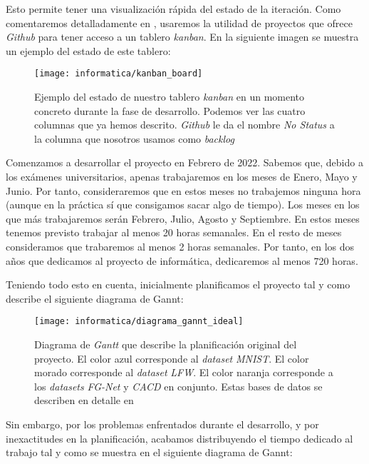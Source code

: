 Esto permite tener una visualización rápida del estado de la iteración. Como comentaremos detalladamente en , usaremos la utilidad de proyectos que ofrece \textit{Github} para tener acceso a un tablero \textit{kanban}. En la siguiente imagen se muestra un ejemplo del estado de este tablero:

\begin{figure}[H]
	\centering
	\texttt{[image: informatica/kanban\_board]}
	\caption{Ejemplo del estado de nuestro tablero \textit{kanban} en un momento concreto durante la fase de desarrollo. Podemos ver las cuatro columnas que ya hemos descrito. \textit{Github} le da el nombre \textit{No Status} a la columna que nosotros usamos como \textit{backlog}}
\end{figure}

Comenzamos a desarrollar el proyecto en Febrero de 2022. Sabemos que, debido a los exámenes universitarios, apenas trabajaremos en los meses de Enero, Mayo y Junio. Por tanto, consideraremos que en estos meses no trabajemos ninguna hora (aunque en la práctica sí que consigamos sacar algo de tiempo). Los meses en los que más trabajaremos serán Febrero, Julio, Agosto y Septiembre. En estos meses tenemos previsto trabajar al menos 20 horas semanales. En el resto de meses consideramos que trabaremos al menos 2 horas semanales. Por tanto, en los dos años que dedicamos al proyecto de informática, dedicaremos al menos 720 horas.

Teniendo todo esto en cuenta, inicialmente planificamos el proyecto tal y como describe el siguiente diagrama de Gannt:

\begin{figure}[H]
	\centering
	\texttt{[image: informatica/diagrama\_gannt\_ideal]}
	\caption{Diagrama de \textit{Gantt} que describe la planificación original del proyecto. El color azul corresponde al \textit{dataset} \textit{MNIST}. El color morado corresponde al \textit{dataset} \textit{LFW}. El color naranja corresponde a los \textit{datasets} \textit{FG-Net} y \textit{CACD} en conjunto. Estas bases de datos se describen en detalle en }
\end{figure}

Sin embargo, por los problemas enfrentados durante el desarrollo, y por inexactitudes en la planificación, acabamos distribuyendo el tiempo dedicado al trabajo tal y como se muestra en el siguiente diagrama de Gannt:

